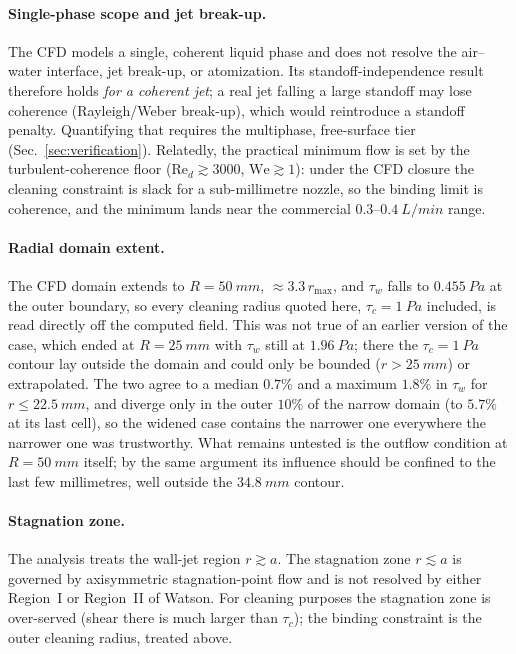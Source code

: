 \documentclass[aps,prfluids,reprint,amsmath,amssymb,floatfix]{revtex4-2}
\newcommand{\Rey}{\mathrm{Re}}
\newcommand{\We}{\mathrm{We}}
\begin{document}
\paragraph{Single-phase scope and jet break-up.}
The CFD models a single, coherent liquid phase and does not resolve the
air--water interface, jet break-up, or atomization. Its standoff-independence
result therefore holds \emph{for a coherent jet}; a real jet falling a large
standoff may lose coherence (Rayleigh/Weber break-up), which would reintroduce
a standoff penalty. Quantifying that requires the multiphase, free-surface
tier (Sec.~\ref{sec:verification}). Relatedly, the practical minimum flow is
set by the turbulent-coherence floor ($\Rey_d \gtrsim 3000$, $\We \gtrsim 1$):
under the CFD closure the cleaning constraint is slack for a sub-millimetre
nozzle, so the binding limit is coherence, and the minimum lands near the
commercial $0.3$--$\SI{0.4}{L/min}$ range.

\paragraph{Radial domain extent.}
The CFD domain extends to $R = \SI{50}{mm}$, $\approx 3.3\,r_\mathrm{max}$, and
$\tau_w$ falls to $\SI{0.455}{Pa}$ at the outer boundary, so every cleaning
radius quoted here, $\tau_c = \SI{1}{Pa}$ included, is read directly off the
computed field. This was not true of an earlier version of the case, which ended
at $R = \SI{25}{mm}$ with $\tau_w$ still at $\SI{1.96}{Pa}$; there the
$\tau_c = \SI{1}{Pa}$ contour lay outside the domain and could only be bounded
($r > \SI{25}{mm}$) or extrapolated. The two agree to a median $0.7\%$ and a
maximum $1.8\%$ in $\tau_w$ for $r \leq \SI{22.5}{mm}$, and diverge only in the
outer $10\%$ of the narrow domain (to $5.7\%$ at its last cell), so the widened
case contains the narrower one everywhere the narrower one was trustworthy. What
remains untested is the outflow condition at $R = \SI{50}{mm}$ itself; by the
same argument its influence should be confined to the last few millimetres, well
outside the $\SI{34.8}{mm}$ contour.

\paragraph{Stagnation zone.}
The analysis treats the wall-jet region $r \gtrsim a$. The stagnation
zone $r \lesssim a$ is governed by axisymmetric stagnation-point flow
and is not resolved by either Region~I or Region~II of Watson. For
cleaning purposes the stagnation zone is over-served (shear there is
much larger than $\tau_c$); the binding constraint is the outer cleaning
radius, treated above.
\end{document}
